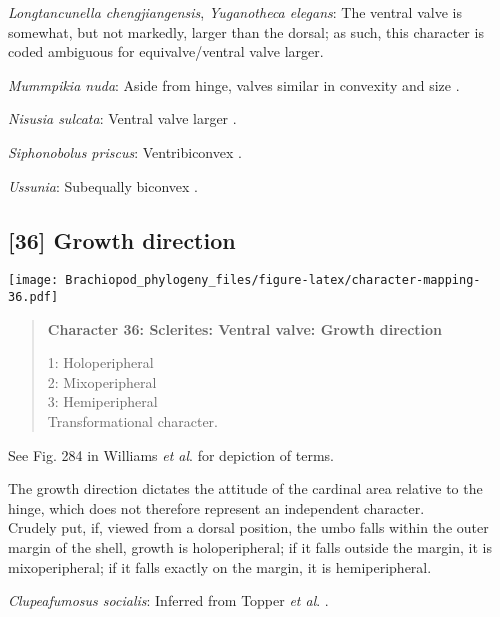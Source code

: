 \documentclass[openany]{book}
\theoremstyle{definition}
\theoremstyle{definition}
\theoremstyle{definition}
\theoremstyle{remark}
\begin{document}
\hypertarget{Longtancunella_chengjiangensis-coding-35}{}
\emph{Longtancunella chengjiangensis}, \emph{Yuganotheca elegans}: The
ventral valve is somewhat, but not markedly, larger than the dorsal; as
such, this character is coded ambiguous for equivalve/ventral valve
larger.

\hypertarget{Mummpikia_nuda-coding-35}{}
\emph{Mummpikia nuda}: Aside from hinge, valves similar in convexity and
size \citep{Balthasar2008iMummpikia}.

\hypertarget{Nisusia_sulcata-coding-35}{}
\emph{Nisusia sulcata}: Ventral valve larger \citep[see][fig.
126.]{Williams2000LinguliformeaCraniiformea}.

\hypertarget{Siphonobolus_priscus-coding-35}{}
\emph{Siphonobolus priscus}: Ventribiconvex
\citep{Popov2009Earlyontogeny}.

\hypertarget{Ussunia-coding-35}{}
\emph{Ussunia}: Subequally biconvex
\citep[p.~192]{Williams2000LinguliformeaCraniiformea}.

\subsection*{{[}36{]} Growth direction}\label{growth-direction-1}

\texttt{[image: Brachiopod\_phylogeny\_files/figure-latex/character-mapping-36.pdf]}

\begin{quote}
\textbf{Character 36: Sclerites: Ventral valve: Growth direction}

1: Holoperipheral\\
2: Mixoperipheral\\
3: Hemiperipheral\\
Transformational character.
\end{quote}

See Fig. 284 in Williams \emph{et al}.
\citeyearpar{Williams1997Introduction} for depiction of terms.

The growth direction dictates the attitude of the cardinal area relative
to the hinge, which does not therefore represent an independent
character.\\
Crudely put, if, viewed from a dorsal position, the umbo falls within
the outer margin of the shell, growth is holoperipheral; if it falls
outside the margin, it is mixoperipheral; if it falls exactly on the
margin, it is hemiperipheral.

\hypertarget{Clupeafumosus_socialis-coding-36}{}
\emph{Clupeafumosus socialis}: Inferred from Topper \emph{et al}.
\citeyearpar{Topper2013Reappraisalof}.
\end{document}
